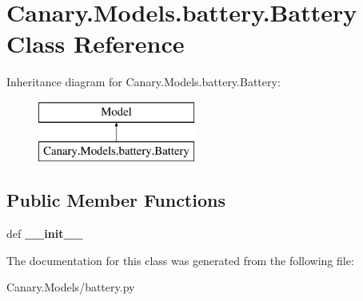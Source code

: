 \hypertarget{class_canary_8_models_1_1battery_1_1_battery}{\section{Canary.\-Models.\-battery.\-Battery Class Reference}
\label{class_canary_8_models_1_1battery_1_1_battery}
}
Inheritance diagram for Canary.\-Models.\-battery.\-Battery\-:\begin{figure}[H]
\begin{center}
\leavevmode
\includegraphics[height=2.000000cm]{class_canary_8_models_1_1battery_1_1_battery}
\end{center}
\end{figure}
\subsection*{Public Member Functions}
\begin{DoxyCompactItemize}
\item 
\hypertarget{class_canary_8_models_1_1battery_1_1_battery_abb79ef19e5e6c69a99dc5c0159a6ade6}{def {\bfseries \-\_\-\-\_\-init\-\_\-\-\_\-}}\label{class_canary_8_models_1_1battery_1_1_battery_abb79ef19e5e6c69a99dc5c0159a6ade6}

\end{DoxyCompactItemize}


The documentation for this class was generated from the following file\-:\begin{DoxyCompactItemize}
\item 
Canary.\-Models/battery.\-py\end{DoxyCompactItemize}

